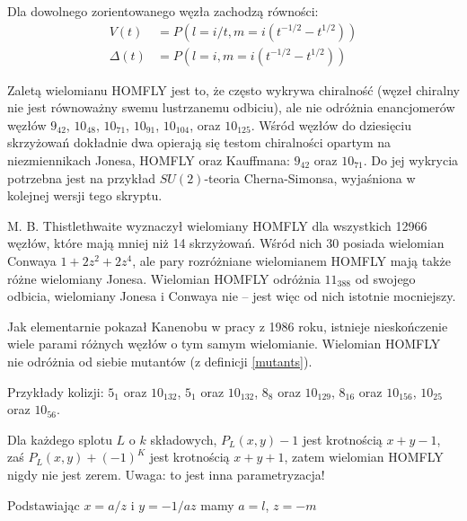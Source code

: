 \begin{proposition}
    Dla dowolnego zorientowanego węzła zachodzą równości:
        \begin{align*}
        V(t) & = P(l = i/t, m = i(t^{-1/2} - t^{1/2})) \\
        \Delta(t) & = P(l = i, m = i(t^{-1/2} - t^{1/2}))
    \end{align*}
\end{proposition}

Zaletą wielomianu HOMFLY jest to, że często wykrywa chiralność (węzeł chiralny nie jest równoważny swemu lustrzanemu odbiciu), ale nie odróżnia enancjomerów węzłów $9_{42}$, $10_{48}$, $10_{71}$, $10_{91}$, $10_{104}$, oraz $10_{125}$.
Wśród węzłów do dziesięciu skrzyżowań dokładnie dwa opierają się testom chiralności opartym na niezmiennikach Jonesa, HOMFLY oraz Kauffmana: $9_{42}$ oraz $10_{71}$.
Do jej wykrycia potrzebna jest na przykład $SU(2)$-teoria Cherna-Simonsa, wyjaśniona w kolejnej wersji tego skryptu.

M. B. Thistlethwaite wyznaczył wielomiany HOMFLY dla wszystkich 12966 węzłów, które mają mniej niż 14 skrzyżowań.
Wśród nich 30 posiada wielomian Conwaya $1 + 2z^2 + 2z^4$, ale pary rozróżniane wielomianem HOMFLY mają także różne wielomiany Jonesa.
Wielomian HOMFLY odróżnia $11_{388}$ od swojego odbicia, wielomiany Jonesa i Conwaya nie -- jest więc od nich istotnie mocniejszy.


Jak elementarnie pokazał Kanenobu w pracy \cite{kanenobu86} z 1986 roku, istnieje nieskończenie wiele parami różnych węzłów o tym samym wielomianie.
Wielomian HOMFLY nie odróżnia od siebie mutantów (z definicji \ref{mutants}).

\begin{example}
    Przykłady kolizji: $5_1$ oraz $10_{132}$, $5_{1}$ oraz $10_{132}$, 
    $8_{8}$ oraz $10_{129}$, $8_{16}$ oraz $10_{156}$, $10_{25}$ oraz $10_{56}$.
\end{example}




Dla każdego splotu $L$ o $k$ składowych, $P_L(x,y) - 1$ jest krotnością $x+y-1$, zaś $P_L(x,y) + (-1)^K$ jest krotnością $x +y + 1$, zatem wielomian HOMFLY nigdy nie jest zerem.
Uwaga: to jest inna parametryzacja!

Podstawiając $x = a/z$ i $y = -1/az$ mamy $a = l$, $z = -m$
